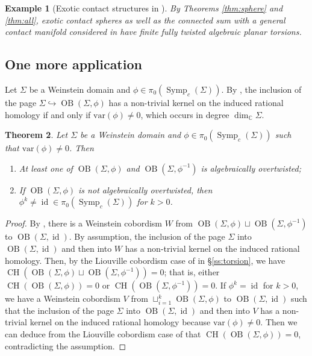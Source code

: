 \documentclass[11pt]{amsart}
\numberwithin{equation}{section}
\newtheorem{theorem}{\textbf{Theorem}}[section]
\newtheorem{example}[theorem]{\textbf{Example}}
\def\C{{\mathbb C}}
\DeclareMathOperator{\Id}{id}
\DeclareMathOperator{\symp}{Symp}
\DeclareMathOperator{\OB}{OB}
\DeclareMathOperator{\CH}{CH}
\begin{document}
\begin{example}[Exotic contact structures in \cite{bowden2022tight}]
    By Theorems \ref{thm:sphere} and \ref{thm:all}, exotic contact spheres as well as the connected sum with a general contact manifold considered in \cite{bowden2022tight} have finite fully twisted algebraic planar torsions.
\end{example}


\subsection{One more application}\label{ss:app}
Let $\Sigma$ be a Weinstein domain and $\phi\in \pi_0(\symp_c(\Sigma))$. By \cite[Lemma 2.2]{zbMATH07738054}, the inclusion of the page $\Sigma \hookrightarrow \OB(\Sigma,\phi)$ has a non-trivial kernel on the induced rational homology if and only if $\mathrm{var}(\phi)\ne 0$, which occurs in degree $\dim_{\C}\Sigma$.


\begin{theorem}\label{thm:OB}
Let $\Sigma$ be a Weinstein domain and $\phi\in \pi_0(\symp_c(\Sigma))$ such that $\mathrm{var}(\phi)\ne 0$. Then
\begin{enumerate}
    \item At least one of $\OB(\Sigma,\phi)$ and $\OB(\Sigma,\phi^{-1})$ is algebraically overtwisted;
    \item If $\OB(\Sigma,\phi)$ is not algebraically overtwisted, then $\phi^k\ne \Id \in \pi_0(\symp_c(\Sigma))$ for $k>0$.
\end{enumerate}
\end{theorem}
\begin{proof}
By \cite[Proposition 8.2]{Russell}, there is a Weinstein cobordism $W$ from $\OB(\Sigma,\phi)\sqcup \OB(\Sigma,\phi^{-1})$ to $\OB(\Sigma,\Id)$. By assumption, the inclusion of the page $\Sigma$ into $\OB(\Sigma,\Id)$ and then into $W$ has a non-trivial kernel on the induced rational homology. Then, by the Liouville cobordism case of  in \S \ref{ss:torsion}, we have $\CH(\OB(\Sigma,\phi)\sqcup \OB(\Sigma,\phi^{-1}))=0$; that is, either $\CH(\OB(\Sigma,\phi))=0$ or $\CH(\OB(\Sigma,\phi^{-1}))=0$. If $\phi^k=\Id$ for $k>0$, we have a Weinstein cobordism $V$ from $\sqcup_{i=1}^k\OB(\Sigma,\phi)$ to $\OB(\Sigma,\Id)$ such that the inclusion of the page $\Sigma$ into $\OB(\Sigma,\Id)$ and then into $V$ has a non-trivial kernel on the induced rational homology because $\mathrm{var}(\phi)\ne 0$. Then we can deduce from the Liouville cobordism case of  that $\CH(\OB(\Sigma,\phi))=0$, contradicting the assumption.
\end{proof}
\end{document}
